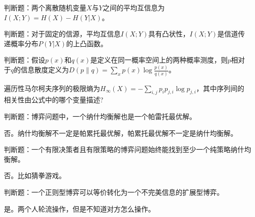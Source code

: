 \begin{problem}
	判断题：两个离散随机变量$X$与$Y$之间的平均互信息为$I(X;Y)=H(X)-H(Y|X)$。
\end{problem}
\begin{solution}

\end{solution}


\begin{problem}
	判断题：对于固定的信源，平均互信息$I(X;Y)$具有凸状性，$I(X;Y)$是信道传递概率分布$P(Y|X)$的上凸函数。
\end{problem}
\begin{solution}

\end{solution}


\begin{problem}
	判断题：假设$p(x)$和$q(x)$是定义在同一概率空间上的两种概率测度，则$p$相对于$q$的信息散度定义为$D(p\|q)=\sum_xp(x)\log\frac{p(x)}{q(x)}$。
\end{problem}
\begin{solution}

\end{solution}


\begin{problem}
	遍历性马尔柯夫序列的极限熵为$H_\infty(X)=-\sum_{i,j}p_ip_{j,i}\log p_{j,i}$，其中序列间的相关性由公式中的哪个变量描述?
\end{problem}
\begin{solution}

\end{solution}


\begin{problem}
	判断题：博弈问题中，一个纳什均衡解也是一个帕雷托最优解。
\end{problem}
\begin{solution}
	否。纳什均衡解不一定是帕累托最优解，帕累托最优解不一定是纳什均衡解。
\end{solution}


\begin{problem}
	判断题：一个有限决策者且有限策略的博弈问题始终能找到至少一个纯策略纳什均衡解。
\end{problem}
\begin{solution}
	否。比如猜拳游戏。
\end{solution}


\begin{problem}
	判断题：一个正则型博弈可以等价转化为一个不完美信息的扩展型博弈。
\end{problem}
\begin{solution}
	是。两个人轮流操作，但是不知道对方怎么操作。
\end{solution}


